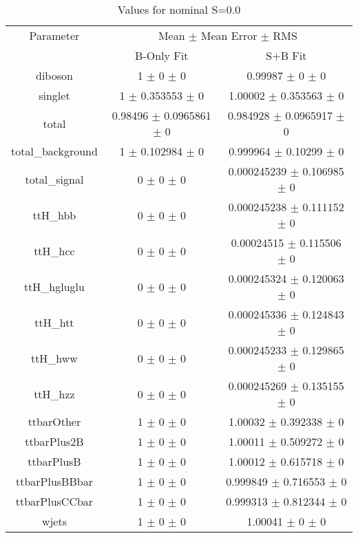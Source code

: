 \begin{table}
\centering
\caption{Values for nominal S=0.0}
\begin{tabular}{ccc}
\toprule
Parameter & \multicolumn{2}{c}{Mean $\pm$ Mean Error $\pm$ RMS}\\
 & B-Only Fit & S+B Fit\\
\midrule
diboson & \num{1} $\pm$ \num{0} $\pm$ \num{0} & \num{0.99987} $\pm$ \num{0} $\pm$ \num{0}\\
singlet & \num{1} $\pm$ \num{0.353553} $\pm$ \num{0} & \num{1.00002} $\pm$ \num{0.353563} $\pm$ \num{0}\\
total & \num{0.98496} $\pm$ \num{0.0965861} $\pm$ \num{0} & \num{0.984928} $\pm$ \num{0.0965917} $\pm$ \num{0}\\
total\_background & \num{1} $\pm$ \num{0.102984} $\pm$ \num{0} & \num{0.999964} $\pm$ \num{0.10299} $\pm$ \num{0}\\
total\_signal & \num{0} $\pm$ \num{0} $\pm$ \num{0} & \num{0.000245239} $\pm$ \num{0.106985} $\pm$ \num{0}\\
ttH\_hbb & \num{0} $\pm$ \num{0} $\pm$ \num{0} & \num{0.000245238} $\pm$ \num{0.111152} $\pm$ \num{0}\\
ttH\_hcc & \num{0} $\pm$ \num{0} $\pm$ \num{0} & \num{0.00024515} $\pm$ \num{0.115506} $\pm$ \num{0}\\
ttH\_hgluglu & \num{0} $\pm$ \num{0} $\pm$ \num{0} & \num{0.000245324} $\pm$ \num{0.120063} $\pm$ \num{0}\\
ttH\_htt & \num{0} $\pm$ \num{0} $\pm$ \num{0} & \num{0.000245336} $\pm$ \num{0.124843} $\pm$ \num{0}\\
ttH\_hww & \num{0} $\pm$ \num{0} $\pm$ \num{0} & \num{0.000245233} $\pm$ \num{0.129865} $\pm$ \num{0}\\
ttH\_hzz & \num{0} $\pm$ \num{0} $\pm$ \num{0} & \num{0.000245269} $\pm$ \num{0.135155} $\pm$ \num{0}\\
ttbarOther & \num{1} $\pm$ \num{0} $\pm$ \num{0} & \num{1.00032} $\pm$ \num{0.392338} $\pm$ \num{0}\\
ttbarPlus2B & \num{1} $\pm$ \num{0} $\pm$ \num{0} & \num{1.00011} $\pm$ \num{0.509272} $\pm$ \num{0}\\
ttbarPlusB & \num{1} $\pm$ \num{0} $\pm$ \num{0} & \num{1.00012} $\pm$ \num{0.615718} $\pm$ \num{0}\\
ttbarPlusBBbar & \num{1} $\pm$ \num{0} $\pm$ \num{0} & \num{0.999849} $\pm$ \num{0.716553} $\pm$ \num{0}\\
ttbarPlusCCbar & \num{1} $\pm$ \num{0} $\pm$ \num{0} & \num{0.999313} $\pm$ \num{0.812344} $\pm$ \num{0}\\
wjets & \num{1} $\pm$ \num{0} $\pm$ \num{0} & \num{1.00041} $\pm$ \num{0} $\pm$ \num{0}\\
\bottomrule
\end{tabular}
\end{table}